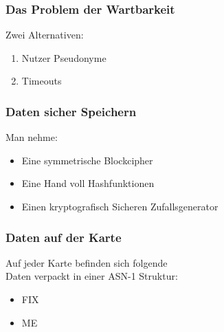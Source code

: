 \begin{frame}
	\frametitle{Das Problem der Wartbarkeit}
	Zwei Alternativen:
	\begin{enumerate}
		\item<2-> Nutzer Pseudonyme
		\item<3-> Timeouts
	\end{enumerate}
\end{frame}

\begin{frame}
	\frametitle{Daten sicher Speichern}
	Man nehme:
	\begin{itemize}
		\item<2-> Eine symmetrische Blockcipher
		\item<3-> Eine Hand voll Hashfunktionen
		\item<4-> Einen kryptografisch Sicheren Zufallsgenerator
	\end{itemize}
\end{frame}

\begin{frame}
	\frametitle{Daten auf der Karte}
	Auf jeder Karte befinden sich folgende\\
	Daten verpackt in einer ASN-1 Struktur:
	\begin{itemize}
		\item<2-> FIX
		\item<3-> ME
	\end{itemize}
\end{frame}

